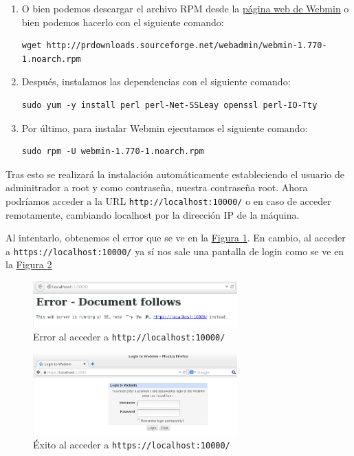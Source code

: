 \documentclass[10pt,a4paper,spanish]{article}
\numberwithin{equation}{section} %
\numberwithin{figure}{section} %
\numberwithin{table}{section} %
\begin{document}
\begin{enumerate}[1.]
    \item O bien podemos descargar el archivo RPM desde la \href{http://www.webmin.com/download.html}{página web de Webmin} o bien podemos hacerlo con el siguiente comando:
\begin{verbatim}
wget http://prdownloads.sourceforge.net/webadmin/webmin-1.770-1.noarch.rpm
\end{verbatim}

\item Después, instalamos las dependencias con el siguiente comando:
\begin{verbatim}
sudo yum -y install perl perl-Net-SSLeay openssl perl-IO-Tty
\end{verbatim}

\item Por último, para instalar Webmin ejecutamos el siguiente comando:
\begin{verbatim}
sudo rpm -U webmin-1.770-1.noarch.rpm
\end{verbatim}
\end{enumerate}

Tras esto se realizará la instalación automáticamente estableciendo el usuario de adminitrador a root y como contraseña, nuestra contraseña root. Ahora podríamos acceder a la URL \texttt{http://localhost:10000/} o en caso de acceder remotamente, cambiando localhost por la dirección IP de la máquina. 

Al intentarlo, obtenemos el error que se ve en la \hyperref[errorwebmin]{Figura \ref*{errorwebmin}}. En cambio, al acceder a \texttt{https://localhost:10000/} ya sí nos sale una pantalla de login como se ve en la \hyperref[webminok]{Figura \ref*{webminok}}

\begin{figure}[!h]
    \centering
    \includegraphics[width=0.7\textwidth]{28}
    \caption{Error al acceder a \texttt{http://localhost:10000/}}
    \label{errorwebmin}
\end{figure}

\begin{figure}[!h]
    \centering
    \includegraphics[width=0.7\textwidth]{29}
    \caption{Éxito al acceder a \texttt{https://localhost:10000/}}
    \label{webminok}
\end{figure}
\end{document}
